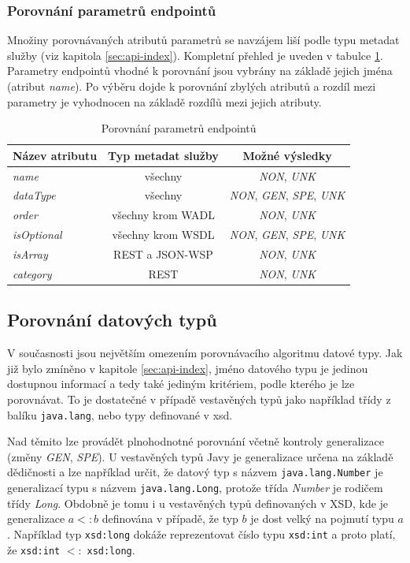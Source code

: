 \documentclass[czech,DP]{thesiskiv}
\begin{document}
\subsubsection{Porovnání parametrů endpointů}

Množiny porovnávaných atributů parametrů se navzájem liší podle typu metadat služby (viz kapitola \ref{sec:api-index}). Kompletní přehled je uveden v tabulce \ref{tab:param-cmp}. Parametry endpointů vhodné k porovnání jsou vybrány na základě jejich jména (atribut \textit{name}). Po výběru dojde k porovnání zbylých atributů a rozdíl mezi parametry je vyhodnocen na základě rozdílů mezi jejich atributy.

\begin{table}[h]
	\centering
	\begin{tabular}{|l|c|c|}
		\hline
		Název atributu & Typ metadat služby & Možné výsledky \\
		\hline
		\hline
		\textit{name} & všechny & \textit{NON}, \textit{UNK} \\
		\hline 
		\textit{dataType} & všechny & \textit{NON}, \textit{GEN}, \textit{SPE}, \textit{UNK} \\
		\hline
		\textit{order} & všechny krom WADL & \textit{NON}, \textit{UNK} \\
		\hline
		\textit{isOptional} & všechny krom WSDL & \textit{NON}, \textit{GEN}, \textit{SPE}, \textit{UNK} \\
		\hline
		\textit{isArray} & REST a JSON-WSP & \textit{NON}, \textit{UNK} \\
		\hline
		\textit{category} & REST & \textit{NON}, \textit{UNK} \\
		\hline
	\end{tabular}
	\caption{Porovnání parametrů endpointů }
	\label{tab:param-cmp}
\end{table}


\subsection{Porovnání datových typů}
\label{sec:type-cmp}
V současnosti jsou největším omezením porovnávacího algoritmu datové typy. Jak již bylo zmíněno v kapitole \ref{sec:api-index}, jméno datového typu je jedinou dostupnou informací a tedy také jediným kritériem, podle kterého je lze porovnávat. To je dostatečné v případě vestavěných typů jako například třídy z balíku \verb|java.lang|, nebo typy definované v xsd. 

Nad těmito lze provádět plnohodnotné porovnání včetně kontroly generalizace (změny \textit{GEN}, \textit{SPE}). U vestavěných typů Javy je generalizace určena na základě dědičnosti a lze například určit, že datový typ s názvem \verb|java.lang.Number| je generalizací typu s názvem \verb|java.lang.Long|, protože třída \textit{Number} je rodičem třídy \textit{Long}. Obdobně je tomu i u vestavěných typů definovaných v XSD, kde je generalizace $a <: b$ definována v případě, že typ $b$ je dost velký na pojmutí typu $a$. Například typ \verb|xsd:long| dokáže reprezentovat číslo typu \verb|xsd:int| a proto platí, že \verb|xsd:int| $<:$ \verb|xsd:long|. 
\end{document}

